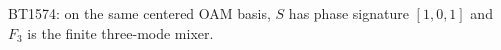 \begin{center}\small
BT1574: on the same centered OAM basis, $S$ has phase signature $[1,0,1]$ and $F_3$ is the finite three-mode mixer.
\end{center}

